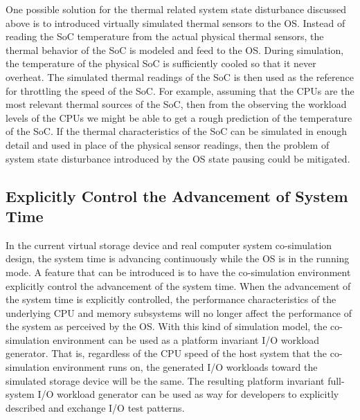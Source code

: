 One possible solution for the thermal related system state disturbance discussed above is to introduced virtually simulated thermal sensors to the OS. Instead of reading the SoC temperature from the actual physical thermal sensors, the thermal behavior of the SoC is modeled and feed to the OS. During simulation, the temperature of the physical SoC is sufficiently cooled so that it never overheat. The simulated thermal readings of the SoC is then used as the reference for throttling the speed of the SoC. For example, assuming that the CPUs are the most relevant thermal sources of the SoC, then from the observing the workload levels of the CPUs we might be able to get a rough prediction of the temperature of the SoC. If the thermal characteristics of the SoC can be simulated in enough detail and used in place of the physical sensor readings, then the problem of system state disturbance introduced by the OS state pausing could be mitigated.

\subsection{Explicitly Control the Advancement of System Time}

In the current virtual storage device and real computer system co-simulation design, the system time is advancing continuously while the OS is in the running mode. A feature that can be introduced is to have the co-simulation environment explicitly control the advancement of the system time. When the advancement of the system time is explicitly controlled, the performance characteristics of the underlying CPU and memory subsystems will no longer affect the performance of the system as perceived by the OS. With this kind of simulation model, the co-simulation environment can be used as a platform invariant I/O workload generator. That is, regardless of the CPU speed of the host system that the co-simulation environment runs on, the generated I/O workloads toward the simulated storage device will be the same. The resulting platform invariant full-system I/O workload generator can be used as way for developers to explicitly described and exchange I/O test patterns.


